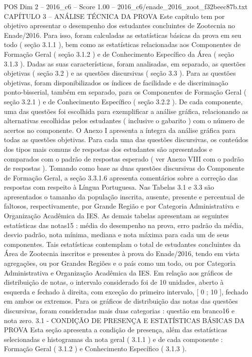 \begin{textsample}{POS Dim 2 – 2016\_c6 – Score 1.00 – 2016\_c6/enade\_2016\_zoot\_f32beec87b.txt}  \label{ex:f2_pos_209}
CAPÍTULO 3 – ANÁLISE TÉCNICA DA PROVA Este capítulo tem por objetivo apresentar o desempenho dos estudantes concluintes de Zootecnia no Enade/2016.
Para isso, foram calculadas as estatísticas básicas da prova em seu todo ( seção 3.1.1 ), bem como as estatísticas relacionadas aos Componentes de Formação Geral ( seção 3.1.2 ) e de Conhecimento Específico da Área ( seção 3.1.3 ).
Dadas as suas características, foram analisadas, em separado, as questões objetivas ( seção 3.2 ) e as questões discursivas ( seção 3.3 ).
Para as questões objetivas, foram disponibilizados os índices de facilidade e de discriminação ponto-bisserial, também em separado, para os Componentes de Formação Geral ( seção 3.2.1 ) e de Conhecimento Específico ( seção 3.2.2 ).
De cada componente, uma das questões foi escolhida para exemplificar a análise gráfica, relacionando as alternativas escolhidas pelos estudantes ( inclusive o gabarito ) com o número de acertos no componente.
O Anexo I apresenta a íntegra da análise gráfica para todas as questões objetivas.
Para cada uma das questões discursivas, os conteúdos dos tipos mais comuns de respostas dos estudantes são apresentados e comparados com o padrão de respostas esperado ( ver Anexo VIII com o padrão de respostas ).
Tomando como base as duas questões discursivas do Componente de Formação Geral, a seção 3.3.1.6 apresenta comentários sobre a correção das respostas com respeito à Língua Portuguesa.
Nas Tabelas 3.1 e 3.3 são apresentados o tamanho da população inscrita, ausente, presente e percentual de faltosos, respectivamente, por Grande Região e por Categoria Administrativa e Organização Acadêmica da IES.
As demais tabelas apresentam as seguintes estatísticas das notas15 : média do desempenho na prova, erro padrão da média, desvio padrão, nota mínima, mediana e nota máxima para cada um de seus componentes.
Tais estatísticas contemplam o total de estudantes concluintes da Área de Zootecnia inscritos e presentes à prova do Enade/2016, tendo em vista agregações, ou por Grandes Regiões e o país como um todo, ou por Categoria Administrativa e Organização Acadêmica da IES.
Em relação aos gráficos de distribuição de notas, o intervalo considerado foi de 10 unidades, aberto à esquerda e fechado à direita, com exceção do primeiro intervalo, [ 0 ; 10 ], fechado em ambos os extremos.
Para os gráficos de distribuição das notas das questões discursivas, foram consideradas mais duas categorias : questão em branco16 e nota zero. 3.1 - CONDIÇÃO DE PRESENÇA E ESTATÍSTICAS BÁSICAS DA PROVA Esta seção apresenta a condição de presença, além das estatísticas selecionadas e histogramas da nota geral ( 3.1.1 ) e de cada componente : Formação Geral ( 3.1.2 ) e Conhecimento Específico ( 3.1.3 ).

\end{textsample}
